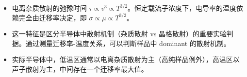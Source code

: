 \begin{insightbox}[物理图像]
\begin{itemize}
    \item 电离杂质散射的弛豫时间 $\tau\propto v^3\propto T^{3/2}$。恒定载流子浓度下，电导率的温度依赖完全由迁移率决定，即 $\sigma\propto\mu\propto T^{3/2}$。
    \item 这一特征是区分半导体中散射机制（杂质散射 vs 晶格散射）的重要实验判据。通过测量迁移率-温度关系，可以判断样品中 dominant 的散射机制。
    \item 实际半导体中，低温区通常以电离杂质散射为主（高纯样品例外），高温区以声子散射为主，中间存在一个迁移率最大值。
\end{itemize}
\end{insightbox}
